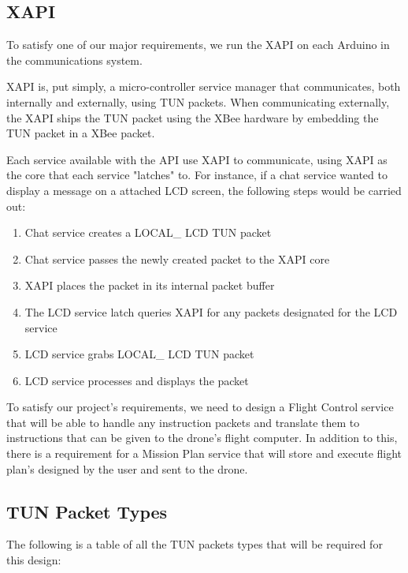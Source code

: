 \documentclass[12pt,a4paper]{article}
\begin{document}
	\subsection{XAPI}
	To satisfy one of our major requirements, we run the XAPI on each Arduino in the communications system. 
	
	XAPI is, put simply, a micro-controller service manager that communicates, both internally and externally, using TUN packets. When communicating externally, the XAPI ships the TUN packet using the XBee hardware by embedding the TUN packet in a XBee packet.
	
	Each service available with the API use XAPI to communicate, using XAPI as the core that each service "latches" to. For instance, if a chat service wanted to display a message on a attached LCD screen, the following steps would be carried out:
	\begin{enumerate}
		\item Chat service creates a LOCAL\_ LCD TUN packet
		\item Chat service passes the newly created packet to the XAPI core
		\item XAPI places the packet in its internal packet buffer
		\item The LCD service latch queries XAPI for any packets designated for the LCD service
		\item LCD service grabs LOCAL\_ LCD TUN packet
		\item LCD service processes and displays the packet
	\end{enumerate}
	
To satisfy our project's requirements, we need to design a Flight Control service that will be able to handle any instruction packets and translate them to instructions that can be given to the drone's flight computer. In addition to this, there is a requirement for a Mission Plan service that will store and execute flight plan's designed by the user and sent to the drone.

	\subsection{TUN Packet Types}
	The following is a table of all the TUN packets types that will be required for this design:
	
\end{document}
